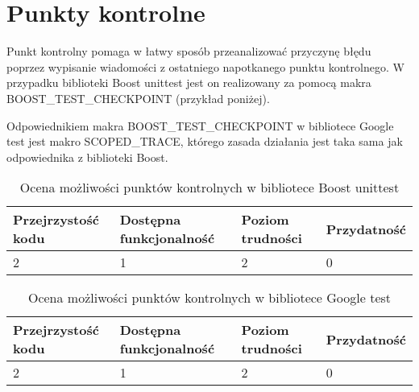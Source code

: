 \documentclass[12pt,a4paper,notitlepage]{report}
\begin{document}
\chapter{Punkty kontrolne}

Punkt kontrolny pomaga w łatwy sposób przeanalizować przyczynę błędu poprzez wypisanie wiadomości z ostatniego napotkanego punktu kontrolnego. W przypadku biblioteki Boost unittest jest on realizowany za pomocą makra BOOST{\_}TEST{\_}CHECKPOINT (przykład poniżej).

			

Odpowiednikiem makra BOOST{\_}TEST{\_}CHECKPOINT w bibliotece Google test jest makro SCOPED{\_}TRACE, którego zasada działania jest taka sama jak odpowiednika z biblioteki Boost.

			

\begin{center}
			\begin{table}[!ht]
			\caption{Ocena możliwości punktów kontrolnych w bibliotece Boost unittest}
			\label{}
			\begin{tabular}[!hc]{|l|l|l|l|}
		\hline
		Przejrzystość kodu 	&	Dostępna funkcjonalność	&	Poziom trudności	&	Przydatność \\ \hline
		2					&	1						&	2					& 	0  			\\ \hline
			\end{tabular}
			\end{table} 
		\end{center}


\begin{center}
			\begin{table}[!ht]
			\caption{Ocena możliwości punktów kontrolnych w bibliotece Google test}
			\label{}
			\begin{tabular}[!hc]{|l|l|l|l|}
		\hline
		Przejrzystość kodu 	&	Dostępna funkcjonalność	&	Poziom trudności	&	Przydatność \\ \hline
		2					&	1						&	2					& 	0  			\\ \hline
			\end{tabular}
			\end{table} 
		\end{center}
\end{document}
